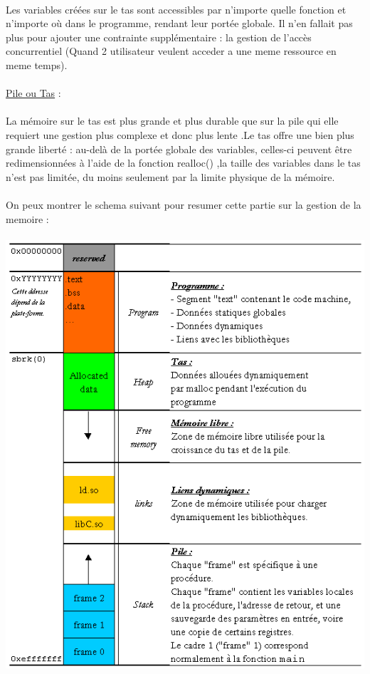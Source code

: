 \documentclass[a4paper,12pt,openany]{book}
\begin{document}
\\
Les variables créées sur le tas sont accessibles par n’importe quelle fonction et n’importe où dans le programme, rendant leur portée globale. Il n’en fallait pas plus pour ajouter une contrainte supplémentaire : la gestion de l’accès concurrentiel (Quand 2 utilisateur veulent acceder a une meme ressource en meme temps).\\
\\
\underline{Pile ou Tas} : \\
\\
La mémoire sur le tas est plus grande et plus durable que sur la pile qui elle requiert une gestion plus complexe et donc plus lente .Le tas offre une bien plus grande liberté : au-delà de la portée globale des variables, celles-ci peuvent être redimensionnées à l’aide de la fonction realloc() ,la taille des variables dans le tas n’est pas limitée, du moins seulement par la limite physique de la mémoire.\\
\\
On peux montrer le schema suivant pour resumer cette partie sur la gestion de la memoire :\\
\\
\includegraphics[width=0.5\linewidth,center]{gestion_memoire.png}\\
\\
\end{document}
